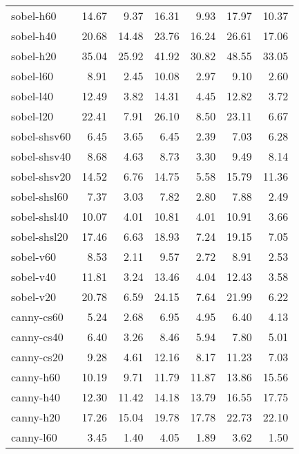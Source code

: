 \begin{tabular}{lrrrrrr}
sobel-h60           &   14.67 &    9.37 &   16.31 &    9.93 &   17.97 &   10.37 \\
sobel-h40           &   20.68 &   14.48 &   23.76 &   16.24 &   26.61 &   17.06 \\
sobel-h20           &   35.04 &   25.92 &   41.92 &   30.82 &   48.55 &   33.05 \\
sobel-l60           &    8.91 &    2.45 &   10.08 &    2.97 &    9.10 &    2.60 \\
sobel-l40           &   12.49 &    3.82 &   14.31 &    4.45 &   12.82 &    3.72 \\
sobel-l20           &   22.41 &    7.91 &   26.10 &    8.50 &   23.11 &    6.67 \\
sobel-shsv60        &    6.45 &    3.65 &    6.45 &    2.39 &    7.03 &    6.28 \\
sobel-shsv40        &    8.68 &    4.63 &    8.73 &    3.30 &    9.49 &    8.14 \\
sobel-shsv20        &   14.52 &    6.76 &   14.75 &    5.58 &   15.79 &   11.36 \\
sobel-shsl60        &    7.37 &    3.03 &    7.82 &    2.80 &    7.88 &    2.49 \\
sobel-shsl40        &   10.07 &    4.01 &   10.81 &    4.01 &   10.91 &    3.66 \\
sobel-shsl20        &   17.46 &    6.63 &   18.93 &    7.24 &   19.15 &    7.05 \\
sobel-v60           &    8.53 &    2.11 &    9.57 &    2.72 &    8.91 &    2.53 \\
sobel-v40           &   11.81 &    3.24 &   13.46 &    4.04 &   12.43 &    3.58 \\
sobel-v20           &   20.78 &    6.59 &   24.15 &    7.64 &   21.99 &    6.22 \\
canny-cs60          &    5.24 &    2.68 &    6.95 &    4.95 &    6.40 &    4.13 \\
canny-cs40          &    6.40 &    3.26 &    8.46 &    5.94 &    7.80 &    5.01 \\
canny-cs20          &    9.28 &    4.61 &   12.16 &    8.17 &   11.23 &    7.03 \\
canny-h60           &   10.19 &    9.71 &   11.79 &   11.87 &   13.86 &   15.56 \\
canny-h40           &   12.30 &   11.42 &   14.18 &   13.79 &   16.55 &   17.75 \\
canny-h20           &   17.26 &   15.04 &   19.78 &   17.78 &   22.73 &   22.10 \\
canny-l60           &    3.45 &    1.40 &    4.05 &    1.89 &    3.62 &    1.50 \\

\end{tabular}

